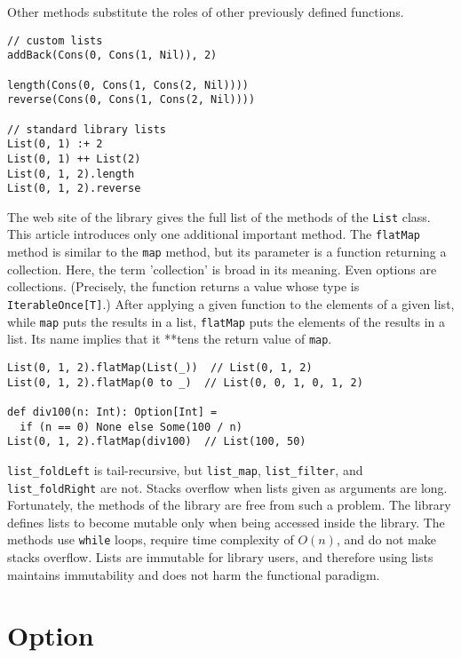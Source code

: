 Other methods substitute the roles of other previously defined functions.

\begin{verbatim}
// custom lists
addBack(Cons(0, Cons(1, Nil)), 2)

length(Cons(0, Cons(1, Cons(2, Nil))))
reverse(Cons(0, Cons(1, Cons(2, Nil))))

// standard library lists
List(0, 1) :+ 2
List(0, 1) ++ List(2)
List(0, 1, 2).length
List(0, 1, 2).reverse
\end{verbatim}

The web site of the
library
gives the full list of the methods of the \verb!List! class. This article
introduces only one additional important method. The \verb!flatMap! method is
similar to the \verb!map! method, but its parameter is a function returning a
collection. Here, the term 'collection' is broad in its meaning. Even options are
collections. (Precisely, the function returns a value whose type is
\verb!IterableOnce[T]!.) After applying a given function to the elements of a
given list, while \verb!map! puts the results in a list, \verb!flatMap! puts the
elements of the results in a list. Its name implies that it **tens the
return value of \verb!map!.

\begin{verbatim}
List(0, 1, 2).flatMap(List(_))  // List(0, 1, 2)
List(0, 1, 2).flatMap(0 to _)  // List(0, 0, 1, 0, 1, 2)

def div100(n: Int): Option[Int] =
  if (n == 0) None else Some(100 / n)
List(0, 1, 2).flatMap(div100)  // List(100, 50)
\end{verbatim}

\verb!list_foldLeft! is tail-recursive, but \verb!list_map!, \verb!list_filter!,
and \verb!list_foldRight! are not. Stacks overflow when lists given as arguments
are long. Fortunately, the methods of the library are free from such a problem.
The library defines lists to become mutable only when being accessed inside the
library. The methods use \verb!while! loops, require time complexity of \(O(n)\),
and do not make stacks overflow. Lists are immutable for library users, and
therefore using lists maintains immutability and does not harm the functional
paradigm.

\section{Option}

